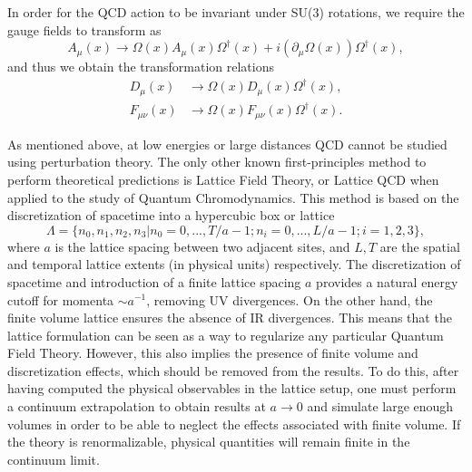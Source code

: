 In order for the QCD action to be invariant under SU(3) rotations, we require the gauge fields to transform as
\begin{equation}
A_{\mu}(x)\to\Omega(x)A_{\mu}(x)\Omega^{\dagger}(x)+i\left(\partial_{\mu}\Omega(x)\right)\Omega^{\dagger}(x),
\end{equation}
and thus we obtain the transformation relations
\begin{align}
D_{\mu}(x)&\to\Omega(x)D_{\mu}(x)\Omega^{\dagger}(x), \\
F_{\mu\nu}(x)&\to\Omega(x)F_{\mu\nu}(x)\Omega^{\dagger}(x).
\end{align}

As mentioned above, at low energies or large distances QCD cannot be studied using perturbation theory. The only other known first-principles method to perform theoretical predictions is Lattice Field Theory, or Lattice QCD when applied to the study of Quantum Chromodynamics. This method is based on the discretization of spacetime into a hypercubic box or lattice
\begin{equation}
\Lambda=\{n_0,n_1,n_2,n_3|n_0=0,...,T/a-1;n_i=0,...,L/a-1;i=1,2,3\},
\end{equation} 
where $a$ is the lattice spacing between two adjacent sites, and $L,T$ are the spatial and temporal lattice extents (in physical units) respectively. The discretization of spacetime and introduction of a finite lattice spacing $a$ provides a natural energy cutoff for momenta $\sim a^{-1}$, removing UV divergences. On the other hand, the finite volume lattice ensures the absence of IR divergences. This means that the lattice formulation can be seen as a way to regularize any particular Quantum Field Theory. However, this also implies the presence of finite volume and discretization effects, which should be removed from the results. To do this, after having computed the physical observables in the lattice setup, one must perform a continuum extrapolation to obtain results at $a\rightarrow0$ and simulate large enough volumes in order to be able to neglect the effects associated with finite volume. If the theory is renormalizable, physical quantities will remain finite in the continuum limit.

